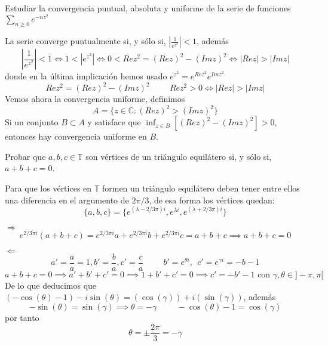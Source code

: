 \begin{ejer}
	Estudiar la convergencia puntual, absoluta y uniforme de la serie de funciones $\sum_{n\geq 0} e^{-nz^2}$
\end{ejer}

\begin{sol}
	La serie converge puntualmente si, y sólo si, $\left| \frac{1}{e^{z^2}} \right| <1$, además
	$$\left| \frac{1}{e^{z^2}} \right| <1 \Longleftrightarrow 1<|e^{z^2}|  \Longleftrightarrow 0<Rez^2 = (Rez)^2-(Imz)^2 
	\Longleftrightarrow |Rez| > |Imz|$$
	donde en la última implicación hemos usado
	$e^{z^2} = e^{Rez^2} e^{Imz^2}$
	$$Rez^2 = (Rez)^2 - (Imz)^2 \hspace{1cm}Rez^2>0 \Longleftrightarrow |Rez| > |Imz|$$
	Vemos ahora la convergencia uniforme, definimos
	$$A = \{ z\in\mathbb{C} : (Rez)^2>(Imz)^2 \}$$
	Si un conjunto $B\subset A$ y satisface que $\inf_{z\in B} [ (Rez)^2-(Imz)^2 ] > 0$, entonces hay convergencia uniforme en $B$.
\end{sol}



\begin{ejer}
	Probar que $a, b, c \in\mathbb{T}$ son vértices de un triángulo equilátero si, y sólo si, $a+b+c = 0$.
\end{ejer}

\begin{sol}
	Para que los vértices en $\mathbb{T}$ formen un triángulo equilátero deben tener entre ellos una diferencia en el argumento de $2\pi/3$, de esa forma los vértices quedan:
	$$\{ a,b,c \} = \{ e^{(\lambda - 2/3\pi)i}, e^{\lambda i}, e^{(\lambda + 2/3\pi)i} \}$$
	
	$\Longrightarrow$
	$$e^{2/3\pi i} (a+b+c) = e^{2/3\pi i} a + e^{2/3\pi i}b + e^{2/3\pi i}c = a+b+c \implies a+b+c=0$$
	
	$\Longleftarrow$
	$$a'=\frac{a}{a} = 1, b'=\frac{b}{a}, c'=\frac{c}{a} \hspace{1cm} b'=e^{\theta i} , \ \ c' = e^{\gamma i} = -b-1$$
	$$a+b+c = 0 \implies a'+b'+c' = 0 \implies 1+b'+c' = 0 \implies c'=-b'-1 \text{ con }\gamma,\theta\in ]-\pi,\pi[$$
	De lo que deducimos que 
	$(-\cos(\theta)-1)-i\sin(\theta) = (\cos(\gamma)) + i(\sin(\gamma))$, además
	$$-\sin(\theta) = \sin(\gamma) \implies \theta = -\gamma 
	\hspace{1cm}-\cos(\theta) -1 =  \cos(\gamma)$$
	por tanto
	$$\theta = \pm\frac{2\pi}{3} = -\gamma$$
\end{sol}




